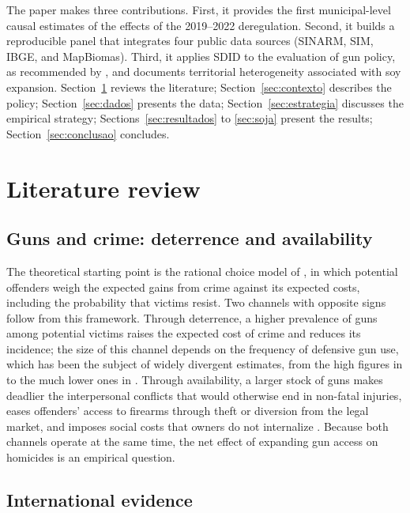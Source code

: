 \documentclass[11pt,a4paper]{article}
\begin{document}
The paper makes three contributions. First, it provides the first municipal-level causal estimates of the effects of the 2019--2022 deregulation. Second, it builds a reproducible panel that integrates four public data sources (SINARM, SIM, IBGE, and MapBiomas). Third, it applies SDID to the evaluation of gun policy, as recommended by \citet{benmichael2024}, and documents territorial heterogeneity associated with soy expansion. Section~\ref{sec:literatura} reviews the literature; Section~\ref{sec:contexto} describes the policy; Section~\ref{sec:dados} presents the data; Section~\ref{sec:estrategia} discusses the empirical strategy; Sections~\ref{sec:resultados} to \ref{sec:soja} present the results; Section~\ref{sec:conclusao} concludes.

\section{Literature review}\label{sec:literatura}

\subsection{Guns and crime: deterrence and availability}

The theoretical starting point is the rational choice model of \citet{becker1968}, in which potential offenders weigh the expected gains from crime against its expected costs, including the probability that victims resist. Two channels with opposite signs follow from this framework. Through deterrence, a higher prevalence of guns among potential victims raises the expected cost of crime and reduces its incidence; the size of this channel depends on the frequency of defensive gun use, which has been the subject of widely divergent estimates, from the high figures in \citet{kleck1995} to the much lower ones in \citet{cook1998}. Through availability, a larger stock of guns makes deadlier the interpersonal conflicts that would otherwise end in non-fatal injuries, eases offenders' access to firearms through theft or diversion from the legal market, and imposes social costs that owners do not internalize \citep{cook2006}. Because both channels operate at the same time, the net effect of expanding gun access on homicides is an empirical question.

\subsection{International evidence}
\end{document}
